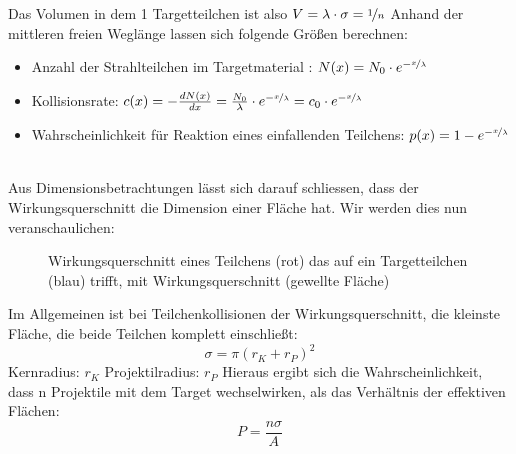 \documentclass[Ex4_Zusammenfassung.tex]{subfiles}
\begin{document}
Das Volumen in dem 1 Targetteilchen ist also $ V = \lambda \cdot \sigma = \nicefrac{1}{n} $  \newline
Anhand der mittleren freien Weglänge lassen sich folgende Größen berechnen: 
\begin{itemize}
\item Anzahl der Strahlteilchen im Targetmaterial : $ N(x) = N_{0} \cdot e^{-\nicefrac{x}{\lambda}} $
\item Kollisionsrate: $ c(x) = - \frac{dN(x)}{dx} = \frac{N_{0}}{\lambda} \cdot e^{-\nicefrac{x}{\lambda}} = c_0 \cdot e^{-\nicefrac{x}{\lambda}} $
\item Wahrscheinlichkeit für Reaktion eines einfallenden Teilchens: $  p(x) = 1- e^{-\nicefrac{x}{\lambda}} $
\end{itemize}
\ \\ 
Aus Dimensionsbetrachtungen lässt sich darauf schliessen, dass der Wirkungsquerschnitt die Dimension einer Fläche hat. Wir werden dies nun veranschaulichen: 
\begin{figure}[h]
\centering
{}
\caption{Wirkungsquerschnitt eines Teilchens (rot) das auf ein Targetteilchen (blau) trifft, mit Wirkungsquerschnitt (gewellte Fläche)}
\end{figure} \newline
Im Allgemeinen ist bei Teilchenkollisionen der Wirkungsquerschnitt, die kleinste Fläche, die beide Teilchen komplett einschließt: 
\begin{equation}
\sigma = \pi (r_{K} + r_{P})^2 
\end{equation}
Kernradius: $ r_K $ \qquad Projektilradius: $ r_P $ \newline
Hieraus ergibt sich die Wahrscheinlichkeit, dass n Projektile mit dem Target wechselwirken, als das Verhältnis der effektiven Flächen:
\begin{equation}
P = \frac{n \sigma}{A}
\end{equation}
\end{document}

